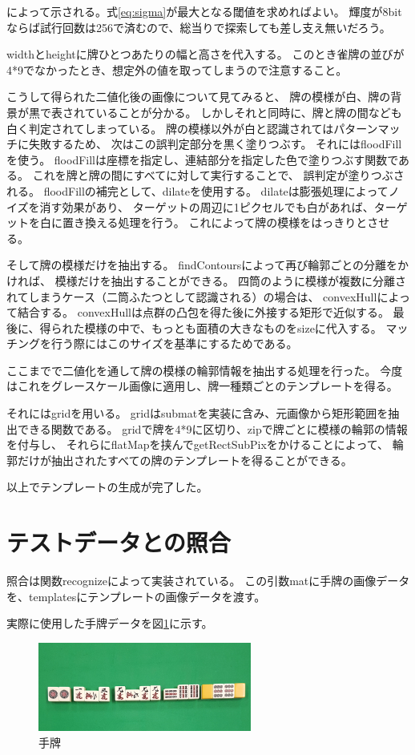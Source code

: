\documentclass{jsarticle}
\begin{document}
\begin{multicols}{2}
によって示される。式\ref{eq:sigma}が最大となる閾値を求めればよい。
輝度が8bitならば試行回数は256で済むので、総当りで探索しても差し支え無いだろう。

widthとheightに牌ひとつあたりの幅と高さを代入する。
このとき雀牌の並びが4*9でなかったとき、想定外の値を取ってしまうので注意すること。

こうして得られた二値化後の画像について見てみると、
牌の模様が白、牌の背景が黒で表されていることが分かる。
しかしそれと同時に、牌と牌の間なども白く判定されてしまっている。
牌の模様以外が白と認識されてはパターンマッチに失敗するため、
次はこの誤判定部分を黒く塗りつぶす。
それにはfloodFillを使う。
floodFillは座標を指定し、連結部分を指定した色で塗りつぶす関数である。
これを牌と牌の間にすべてに対して実行することで、
誤判定が塗りつぶされる。
floodFillの補完として、dilateを使用する。
dilateは膨張処理によってノイズを消す効果があり、
ターゲットの周辺に1ピクセルでも白があれば、ターゲットを白に置き換える処理を行う。
これによって牌の模様をはっきりとさせる。

そして牌の模様だけを抽出する。
findContoursによって再び輪郭ごとの分離をかければ、
模様だけを抽出することができる。
四筒のように模様が複数に分離されてしまうケース（二筒ふたつとして認識される）の場合は、
convexHullによって結合する。
convexHullは点群の凸包を得た後に外接する矩形で近似する。
最後に、得られた模様の中で、もっとも面積の大きなものをsizeに代入する。
マッチングを行う際にはこのサイズを基準にするためである。

ここまでで二値化を通して牌の模様の輪郭情報を抽出する処理を行った。
今度はこれをグレースケール画像に適用し、牌一種類ごとのテンプレートを得る。

それにはgridを用いる。
gridはsubmatを実装に含み、元画像から矩形範囲を抽出できる関数である。
gridで牌を4*9に区切り、zipで牌ごとに模様の輪郭の情報を付与し、
それらにflatMapを挟んでgetRectSubPixをかけることによって、
輪郭だけが抽出されたすべての牌のテンプレートを得ることができる。

以上でテンプレートの生成が完了した。

\section{テストデータとの照合}

照合は関数recognizeによって実装されている。
この引数matに手牌の画像データを、templatesにテンプレートの画像データを渡す。

実際に使用した手牌データを図\ref{fig:hand}に示す。

\begin{figure}[H]
  \begin{center}
    \includegraphics[clip,width=7.0cm]{./img/hand.png}
    \caption{手牌}
    \label{fig:hand}
  \end{center}
\end{figure}


\end{multicols}
\end{document}

